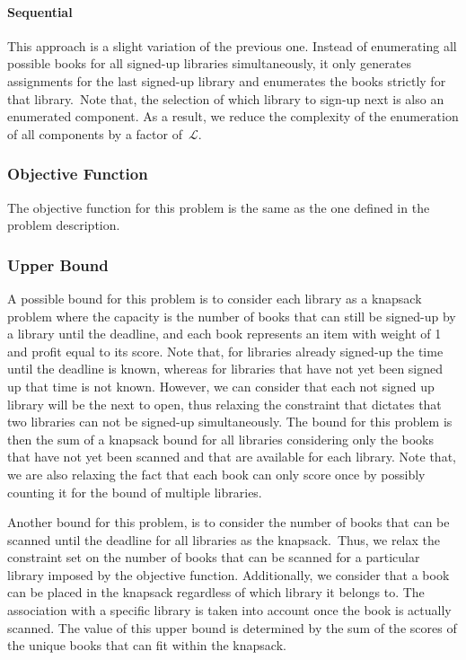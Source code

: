 \paragraph*{Sequential}

This approach is a slight variation of the previous one. Instead of enumerating
all possible books for all signed-up libraries simultaneously, it only generates
assignments for the last signed-up library and enumerates the books strictly for
that library.~Note that, the selection of which library to sign-up next is also
an enumerated component. As a result, we reduce the complexity of the
enumeration of all components by a factor of~$\mathcal{L}$.

\subsubsection*{Objective Function}

The objective function for this problem is the same as the one defined in the
problem description.

\subsubsection*{Upper Bound}

A possible bound for this problem is to consider each library as a knapsack
problem where the capacity is the number of books that can still be signed-up by
a library until the deadline, and each book represents an item with weight of 1
and profit equal to its score. Note that, for libraries already signed-up the
time until the deadline is known, whereas for libraries that have not yet been
signed up that time is not known. However, we can consider that each not signed
up library will be the next to open, thus relaxing the constraint that dictates
that two libraries can not be signed-up simultaneously. The bound for this
problem is then the sum of a knapsack bound for all libraries considering only
the books that have not yet been scanned and that are available for each
library. Note that, we are also relaxing the fact that each book can only score
once by possibly counting it for the bound of multiple libraries.

Another bound for this problem, is to consider the number of books that can be
scanned until the deadline for all libraries as the knapsack.~Thus, we relax the
constraint set on the number of books that can be scanned for a particular
library imposed by the objective function. Additionally, we consider that a book
can be placed in the knapsack regardless of which library it belongs to. The
association with a specific library is taken into account once the book is
actually scanned. The value of this upper bound is determined by the sum of the
scores of the unique books that can fit within the knapsack.

